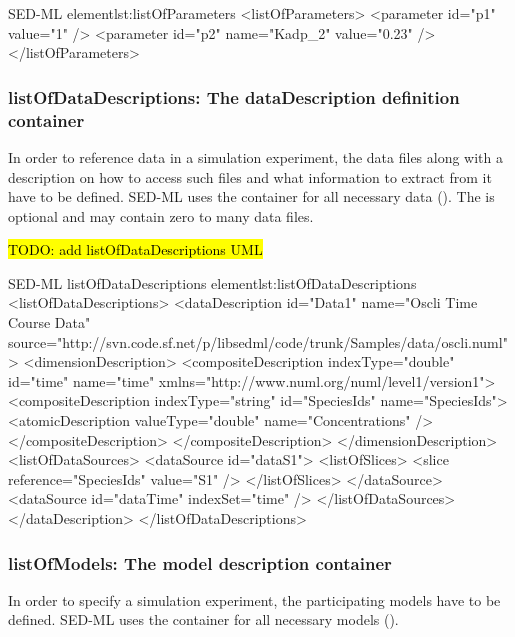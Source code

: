 \begin{myXmlLst}{SED-ML  element}{lst:listOfParameters}
<listOfParameters>
 <parameter id="p1" value="1" />
 <parameter id="p2" name="Kadp_2" value="0.23" />
</listOfParameters>
\end{myXmlLst}


\subsubsection{listOfDataDescriptions: The dataDescription definition container}
\label{sec:listOfDataDescriptions}

In order to reference data in a simulation experiment, the data files along with a description on how to access such files and what information to extract from it have to be defined. SED-ML uses the  container for all necessary data (). The  is optional and may contain zero to many data files.

\hl{TODO: add listOfDataDescriptions UML}


\begin{myXmlLst}{SED-ML listOfDataDescriptions element}{lst:listOfDataDescriptions}
  <listOfDataDescriptions>
	<dataDescription id="Data1" name="Oscli Time Course Data" source="http://svn.code.sf.net/p/libsedml/code/trunk/Samples/data/oscli.numl">
      <dimensionDescription>
        <compositeDescription indexType="double" id="time" name="time" xmlns="http://www.numl.org/numl/level1/version1">
          <compositeDescription indexType="string" id="SpeciesIds" name="SpeciesIds">
            <atomicDescription valueType="double" name="Concentrations" />
          </compositeDescription>
        </compositeDescription>
      </dimensionDescription>
      <listOfDataSources>
        <dataSource id="dataS1">
          <listOfSlices>
            <slice reference="SpeciesIds" value="S1" />
          </listOfSlices>
        </dataSource>
        <dataSource id="dataTime" indexSet="time" />
      </listOfDataSources>
    </dataDescription>
  </listOfDataDescriptions>
\end{myXmlLst}


\subsubsection{listOfModels: The model description container}
\label{sec:listOfModels}
In order to specify a simulation experiment, the participating models have to be defined. SED-ML uses the  container for all necessary models (). 

